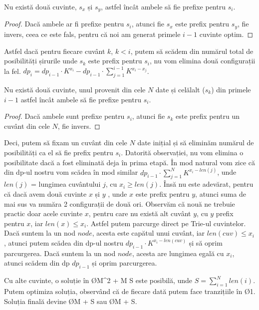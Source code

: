 \begin{observation}
Nu există două cuvinte, $s_x$ și $s_y$, astfel încât ambele să fie prefixe pentru $s_i$.
\begin{proof}
Dacă ambele ar fi prefixe pentru $s_i$, atunci fie $s_x$ este prefix pentru $s_y$, fie invers, ceea ce este fals, pentru că noi am generat primele $i-1$ cuvinte optim.
\end{proof}
\end{observation}
Astfel dacă pentru fiecare cuvânt $k$, $k < i$, putem să scădem din numărul total de posibilități șirurile unde $s_k$ este prefix pentru $s_i$, nu vom elimina două configurații la fel.
$dp_i = dp_{i-1} \cdot K^{x_i} - dp_{i-1} \cdot \sum_{j = 1}^{i-1} K^{x_i - x_j}$.

\begin{observation}
Nu există două cuvinte, unul provenit din cele $N$ date și celălalt ($s_k$) din primele $i-1$ astfel încât ambele să fie prefixe pentru $s_i$.
\begin{proof}
Dacă ambele sunt prefixe pentru $s_i$, atunci fie $s_k$ este prefix pentru un cuvânt din cele $N$, fie invers.
\end{proof}
\end{observation}

Deci, putem să fixam un cuvânt din cele $N$ date inițial și să eliminăm numărul de posibilități ca el să fie prefix pentru $s_i$. Datorită observației, nu vom elimina o posibilitate dacă a fost eliminată deja în prima etapă.
În mod natural vom zice că din dp-ul nostru vom scădea în mod similar $dp_{i-1} \cdot \sum_{j = 1}^{N} K^{x_i - len(j)}$, unde $len(j)$ = lungimea cuvântului $j$, cu $x_i \geq len(j)$. Însă nu este adevărat, pentru că dacă avem două cuvinte $x$ și  $y$ , unde $x$ este prefix pentru $y$, atunci suma de mai sus va număra 2 configurații de două ori. Observăm că nouă ne trebuie practic doar acele cuvinte $x$, pentru care nu există alt cuvânt $y$, cu $y$ prefix pentru $x$, iar $len(x) \leq x_i$.
Astfel putem parcurge direct pe Trie-ul cuvintelor. Dacă suntem la un nod $node$, acesta este capătul unui cuvânt, iar $len(cuv) \leq x_i$, atunci putem scădea din dp-ul nostru $dp_{i-1} \cdot K^{x_i - len(cuv)}$ și să oprim parcurgerea. Dacă suntem la un nod $node$, acesta are lungimea egală cu $x_i$, atunci scădem din dp $dp_{i-1}$ și oprim parcurgerea. 

Cu alte cuvinte, o soluție în \O{M^2 + M \cdot S} este posibilă, unde $S = \sum_{i=1}^{N} len(i)$. Putem optimiza soluția, observând că de fiecare dată putem face tranzițiile în \O{1}. Soluția finală devine \O{M + S} sau \O{M \cdot \log + S}. 
